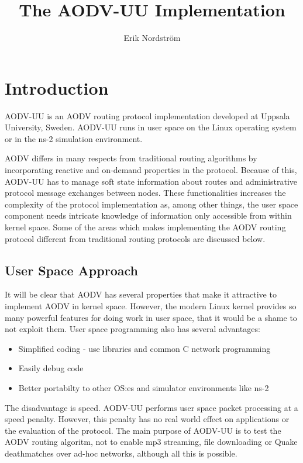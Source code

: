 \documentclass[swedish,10pt,twocolumn]{article}
\title{The AODV-UU Implementation}
\author{Erik Nordstr\"om}
\begin{document}
\maketitle

\tableofcontents

\section{Introduction}

AODV-UU is an AODV routing protocol implementation developed at
Uppsala University, Sweden. AODV-UU runs in user space on the Linux
operating system or in the ns-2\cite{ns-2} simulation environment. 

AODV differs in many respects from traditional routing algorithms by
incorporating reactive and on-demand properties in the
protocol. Because of this, AODV-UU has to manage soft state
information about routes and administrative protocol message exchanges
between nodes. These functionalities increases the complexity of the
protocol implementation as, among other things, the user space
component needs intricate knowledge of information only accessible
from within kernel space. Some of the areas which makes implementing
the AODV routing protocol different from traditional routing protocols
are discussed below.

\subsection{User Space Approach}


It will be clear that AODV has several properties that make it
attractive to implement AODV in kernel space. However, the modern
Linux kernel provides so many powerful features for doing work in user
space, that it would be a shame to not exploit them. User space
programming also has several advantages:

\begin{itemize}
\item Simplified coding - use libraries and common C network programming
\item Easily debug code
\item Better portabilty to other OS:es and simulator environments like ns-2
\end{itemize}

The disadvantage is speed. AODV-UU performs user space packet
processing at a speed penalty. However, this penalty has no real world
effect on applications or the evaluation of the protocol. The main
purpose of AODV-UU is to test the AODV routing algoritm, not to enable
mp3 streaming, file downloading or Quake deathmatches over ad-hoc
networks, although all this is possible.
\end{document}

